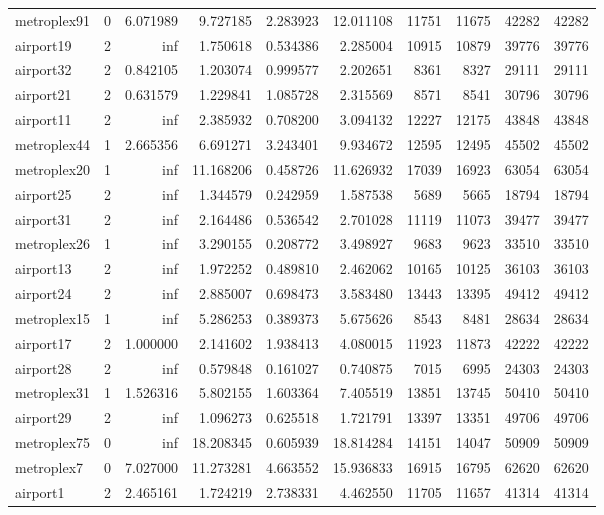 \begin{longtable}{|l|r|r|r|r|r|r|r|r|r|}
metroplex91 & 0 & 6.071989 & 9.727185 & 2.283923 & 12.011108 & 11751 & 11675 & 42282 & 42282 \\
airport19 & 2 & inf & 1.750618 & 0.534386 & 2.285004 & 10915 & 10879 & 39776 & 39776 \\
airport32 & 2 & 0.842105 & 1.203074 & 0.999577 & 2.202651 & 8361 & 8327 & 29111 & 29111 \\
airport21 & 2 & 0.631579 & 1.229841 & 1.085728 & 2.315569 & 8571 & 8541 & 30796 & 30796 \\
airport11 & 2 & inf & 2.385932 & 0.708200 & 3.094132 & 12227 & 12175 & 43848 & 43848 \\
metroplex44 & 1 & 2.665356 & 6.691271 & 3.243401 & 9.934672 & 12595 & 12495 & 45502 & 45502 \\
metroplex20 & 1 & inf & 11.168206 & 0.458726 & 11.626932 & 17039 & 16923 & 63054 & 63054 \\
airport25 & 2 & inf & 1.344579 & 0.242959 & 1.587538 & 5689 & 5665 & 18794 & 18794 \\
airport31 & 2 & inf & 2.164486 & 0.536542 & 2.701028 & 11119 & 11073 & 39477 & 39477 \\
metroplex26 & 1 & inf & 3.290155 & 0.208772 & 3.498927 & 9683 & 9623 & 33510 & 33510 \\
airport13 & 2 & inf & 1.972252 & 0.489810 & 2.462062 & 10165 & 10125 & 36103 & 36103 \\
airport24 & 2 & inf & 2.885007 & 0.698473 & 3.583480 & 13443 & 13395 & 49412 & 49412 \\
metroplex15 & 1 & inf & 5.286253 & 0.389373 & 5.675626 & 8543 & 8481 & 28634 & 28634 \\
airport17 & 2 & 1.000000 & 2.141602 & 1.938413 & 4.080015 & 11923 & 11873 & 42222 & 42222 \\
airport28 & 2 & inf & 0.579848 & 0.161027 & 0.740875 & 7015 & 6995 & 24303 & 24303 \\
metroplex31 & 1 & 1.526316 & 5.802155 & 1.603364 & 7.405519 & 13851 & 13745 & 50410 & 50410 \\
airport29 & 2 & inf & 1.096273 & 0.625518 & 1.721791 & 13397 & 13351 & 49706 & 49706 \\
metroplex75 & 0 & inf & 18.208345 & 0.605939 & 18.814284 & 14151 & 14047 & 50909 & 50909 \\
metroplex7 & 0 & 7.027000 & 11.273281 & 4.663552 & 15.936833 & 16915 & 16795 & 62620 & 62620 \\
airport1 & 2 & 2.465161 & 1.724219 & 2.738331 & 4.462550 & 11705 & 11657 & 41314 & 41314 \\

\end{longtable}
